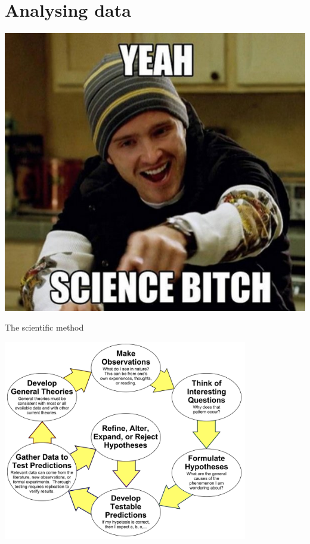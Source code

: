 \part{Analysing data}
\frame{\partpage}

\begin{frame}
	\begin{center}
		\includegraphics[height=0.9\textheight]{science_bitch}
	\end{center}
\end{frame}

\begin{frame}{The scientific method}
	\begin{center}
		\includegraphics[width=0.8\textwidth]{scientific_method}
	\end{center}
\end{frame}

